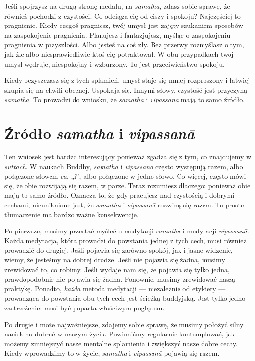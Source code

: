 \documentclass[12pt,openany]{book}
\begin{document}
Jeśli spojrzysz na drugą stronę medalu, na \textit{samatha}, zdasz sobie sprawę, że również pochodzi z czystości. Co odciąga cię od ciszy i spokoju? Najczęściej to pragnienie. Kiedy czegoś pragniesz, twój umysł jest zajęty szukaniem sposobów na zaspokojenie pragnienia. Planujesz i fantazjujesz, myśląc o zaspokojeniu pragnienia w przyszłości. Albo jesteś na coś zły. Bez przerwy rozmyślasz o tym, jak źle albo niesprawiedliwie ktoś cię potraktował. W obu przypadkach twój umysł wędruje, niespokojny i wzburzony. To jest przeciwieństwo spokoju.

Kiedy oczyszczasz się z tych splamień, umysł staje się mniej rozproszony i łatwiej skupia się na chwili obecnej. Uspokaja się. Innymi słowy, czystość jest przyczyną \textit{samatha}. To prowadzi do wniosku, że \textit{samatha} i \textit{vipassanā} mają to samo źródło.

\chapter*{Źródło \textit{samatha} i \textit{vipassanā}}

Ten wniosek jest bardzo interesujący ponieważ zgadza się z tym, co znajdujemy w \textit{suttach}. W naukach Buddhy, \textit{samatha} i \textit{vipassanā} często występują razem, albo połączone słowem \textit{ca}, „i”, albo połączone w jedno słowo. Co więcej, często mówi się, że obie rozwijają się razem, w parze. Teraz rozumiesz dlaczego: ponieważ obie mają to samo źródło. Oznacza to, że gdy pracujesz nad czystością i dobrymi cechami, nieuniknione jest, że \textit{samatha} i \textit{vipassanā} rozwiną się razem. To proste tłumaczenie ma bardzo ważne konsekwencje.

Po pierwsze, musimy przestać myśleć o medytacji \textit{samatha} i medytacji \textit{vipassanā}. Każda medytacja, która prowadzi do powstania jednej z tych cech, musi również prowadzić do drugiej. Jeśli pojawia się zarówno spokój, jak i jasne widzenie, wiemy, że jesteśmy na dobrej drodze. Jeśli nie pojawia się żadna, musimy zrewidować to, co robimy. Jeśli wydaje nam się, że pojawia się tylko jedna, prawdopodobnie nie pojawia się żadna. Ponownie, musimy zrewidować naszą praktykę. Ponadto, \textit{każda} metoda medytacji --- niezależnie od etykiety --- prowadząca do powstania obu tych cech jest ścieżką buddyjską. Jest tylko jedno zastrzeżenie: musi być poparta właściwym poglądem.

Po drugie i może najważniejsze, zdajemy sobie sprawę, że musimy położyć silny nacisk na dobroć w naszym życiu. Powinniśmy regularnie kontemplować, jak możemy zmniejszyć nasze men\-tal\-ne splamienia i zwiększyć nasze dobre cechy. Kiedy wprowadzimy to w życie, \textit{samatha} i \textit{vipassanā} pojawią się razem.
\end{document}
